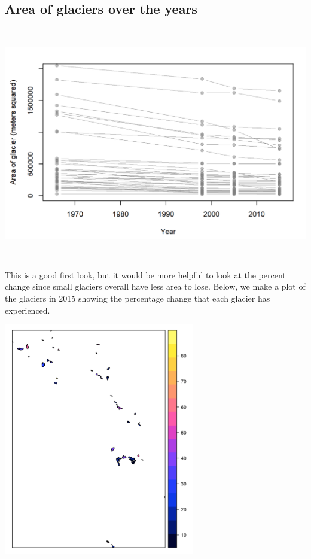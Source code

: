 \documentclass[11pt]{article}
\begin{document}
\subsection*{Area of glaciers over the years}

\begin{center}
\includegraphics[height=4in]{area_glacier_time.png}
\end{center}

This is a good first look, but it would be more helpful to look at the percent change since small glaciers overall have less area to lose. Below, we make a plot of the glaciers in 2015 showing the percentage change that each glacier has experienced.\\

\begin{center}
\includegraphics[height=4in]{q5.png}
\end{center}
\end{document}
